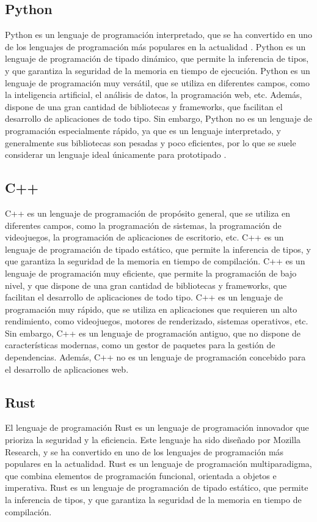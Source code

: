 \subsection{Python}
Python es un lenguaje de programación interpretado, que se ha convertido en uno de los lenguajes de programación más populares en la actualidad \autocite{TIOBEIndex}. Python es un lenguaje de programación de tipado dinámico, que permite la inferencia de tipos, y que garantiza la seguridad de la memoria en tiempo de ejecución. Python es un lenguaje de programación muy versátil, que se utiliza en diferentes campos, como la inteligencia artificial, el análisis de datos, la programación web, etc. Además, dispone de una gran cantidad de bibliotecas y frameworks, que facilitan el desarrollo de aplicaciones de todo tipo. Sin embargo, Python no es un lenguaje de programación especialmente rápido, ya que es un lenguaje interpretado, y generalmente sus bibliotecas son pesadas y poco eficientes, por lo que se suele considerar un lenguaje ideal únicamente para prototipado \autocite{SlowestProgrammingLanguages2020}.

\subsection{C++}
C++ es un lenguaje de programación de propósito general, que se utiliza en diferentes campos, como la programación de sistemas, la programación de videojuegos, la programación de aplicaciones de escritorio, etc. C++ es un lenguaje de programación de tipado estático, que permite la inferencia de tipos, y que garantiza la seguridad de la memoria en tiempo de compilación. C++ es un lenguaje de programación muy eficiente, que permite la programación de bajo nivel, y que dispone de una gran cantidad de bibliotecas y frameworks, que facilitan el desarrollo de aplicaciones de todo tipo. C++ es un lenguaje de programación muy rápido, que se utiliza en aplicaciones que requieren un alto rendimiento, como videojuegos, motores de renderizado, sistemas operativos, etc. Sin embargo, C++ es un lenguaje de programación antiguo, que no dispone de características modernas, como un gestor de paquetes para la gestión de dependencias. Además, C++ no es un lenguaje de programación concebido para el desarrollo de aplicaciones web.

\subsection{Rust}
El lenguaje de programación Rust es un lenguaje de programación innovador que prioriza la seguridad y la eficiencia. Este lenguaje ha sido diseñado por Mozilla Research, y se ha convertido en uno de los lenguajes de programación más populares en la actualidad. Rust es un lenguaje de programación multiparadigma, que combina elementos de programación funcional, orientada a objetos e imperativa. Rust es un lenguaje de programación de tipado estático, que permite la inferencia de tipos, y que garantiza la seguridad de la memoria en tiempo de compilación. 

